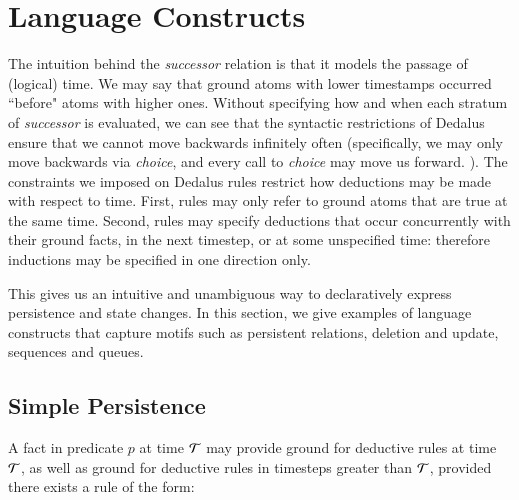  \section{Language Constructs}




The intuition behind the \emph{successor} relation is that it models the passage of (logical) time.  
We may say that ground atoms with lower timestamps occurred ``before" atoms with higher ones.
Without specifying how and when each stratum
of \emph{successor} is evaluated, we can see that the syntactic restrictions of Dedalus ensure that we cannot move backwards infinitely often (specifically,
we may only move backwards via \emph{choice}, and every call to \emph{choice} may move us forward.  ).
The constraints we imposed on Dedalus rules restrict how deductions may be made with respect to time.  First, rules may only refer to ground atoms that
are true at the same time.  Second, rules may specify deductions that occur concurrently with their ground facts, in the next timestep, or at some
unspecified time: therefore inductions may be specified in one direction only.

This gives us an intuitive and unambiguous way to declaratively express persistence and state changes.  In this section, we 
give examples of language constructs that capture motifs such as persistent relations, deletion and update, sequences
and queues.

\subsection{Simple Persistence}

A fact in predicate $p$ at time $\Tau$ may provide ground for deductive rules
at time $\Tau$, as well as ground for deductive rules in timesteps greater than $\Tau$,
provided there exists a rule of the form:

